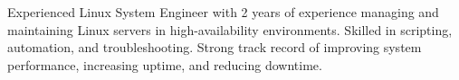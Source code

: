 \begin{cvparagraph}

Experienced Linux System Engineer with 2 years of experience managing and maintaining Linux servers in high-availability environments. Skilled in scripting, automation, and troubleshooting. Strong track record of improving system performance, increasing uptime, and reducing downtime.
\end{cvparagraph}
